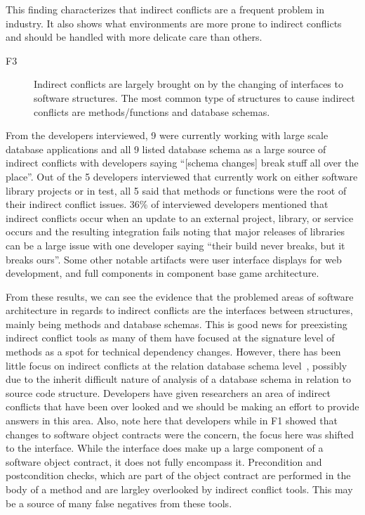 \documentclass[conference]{IEEEtran}
\makeatletter
\def\namedlabel#1#2{\begingroup
   \def\@currentlabel{#2}%
   \label{#1}\endgroup
}
\makeatother
\begin{document}
This finding characterizes that indirect conflicts are a frequent problem in industry. It also shows what environments are more prone to indirect
conflicts and should be handled with more delicate care than others.

\begin{description}
	\item[F3\namedlabel{itm:f3}{F3}] Indirect conflicts are largely brought on by the changing of interfaces to software structures. The most common type of structures
						to cause indirect conflicts are methods/functions and database schemas.
\end{description}

From the developers interviewed, 9 were currently working with large scale database applications and all 9 listed database
schema as a large source of indirect conflicts with developers saying ``[schema changes] break stuff all over the place''.
Out of the 5 developers interviewed that currently work on either software
library projects or in test, all 5 said that methods or functions were the root of their indirect conflict issues. 
36\% of interviewed developers mentioned that indirect conflicts occur when an update to an external project, library, or service occurs and the resulting 
integration fails noting that major releases of libraries can be a large issue with one developer saying 
``their build never breaks, but it breaks ours''. Some
other notable artifacts were user interface displays for web development, and full components in component base game
architecture. 

From these results, we can see the evidence that the problemed areas of software architecture in regards to indirect conflicts are
the interfaces between structures, mainly being methods and database schemas. This is good news for preexisting indirect conflict tools as
many of them have focused at the signature level of methods as a spot for technical dependency changes. However, there has been little focus on indirect
conflicts at the relation database schema level~\cite{Maule:2008:IAD}, possibly due to the inherit difficult nature
of analysis of a database schema in relation to source code structure. Developers have given researchers an area of indirect conflicts that have been
over looked and we should be making an effort to provide answers in this area. Also, note here that developers while in F1 showed that changes to software
object contracts were the concern, the focus here was shifted to the interface. While the interface does make up a large component of a software object contract,
it does not fully encompass it. Precondition and postcondition checks, which are part of the object contract are performed in the body of a method and are largley overlooked
by indirect conflict tools. This may be a source of many false negatives from these tools.
\end{document}
